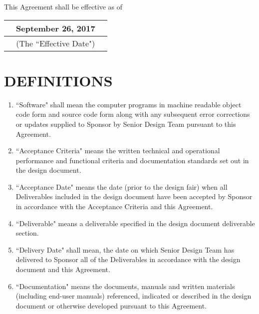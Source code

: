 \documentclass[11pt]{article}
\begin{document}
This Agreement shall be effective as of
\begin{tabularx}{\textwidth-}{X c X}
& September 26, 2017 & \\ \hline
& {\footnotesize (The ``Effective Date")} &
\end{tabularx}

\section{DEFINITIONS }
\begin{enumerate}  \itemsep4pt \parskip0pt 
\item ``Software" shall mean the computer programs in machine readable       object code form and source code form along with any subsequent error corrections or updates supplied to Sponsor by Senior Design Team pursuant to this Agreement.

\item ``Acceptance Criteria" means the written technical and operational       performance and functional criteria and documentation standards set out in the design document.   

\item ``Acceptance Date" means the date (prior to the design fair) when all Deliverables included in the design document have been accepted by Sponsor in accordance with the Acceptance Criteria and this Agreement.    

\item  ``Deliverable" means a deliverable specified in the design document deliverable section.

\item  ``Delivery Date" shall mean, the date on which Senior Design Team has delivered to Sponsor all of the Deliverables in accordance with the design document and this Agreement.

\item  ``Documentation" means the documents, manuals and written materials       (including end-user manuals) referenced, indicated or described in the design document or otherwise developed pursuant to this Agreement.      
\end{enumerate}
\end{document}

